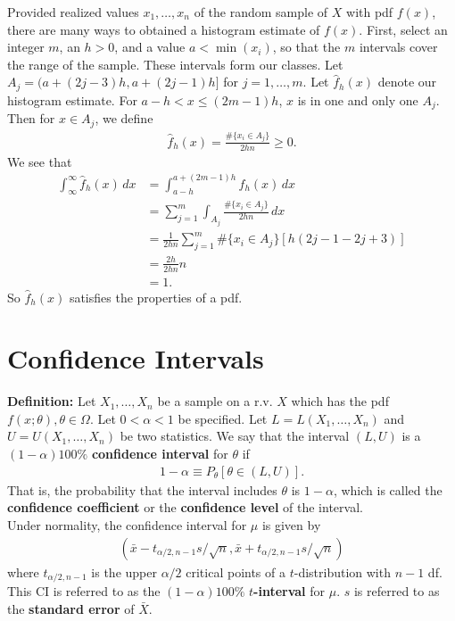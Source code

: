\documentclass{book}
\theoremstyle{definition}
\newcommand{\nn}{\nonumber}
\newcommand{\f}[2]{\frac{#1}{#2}}
\newcommand{\lp}{\left(}
\newcommand{\rp}{\right)}
\begin{document}
Provided realized values $x_1,\dots,x_n$ of the random sample of $X$ with pdf $f(x)$, there are many ways to obtained a histogram estimate of $f(x)$. First, select an integer $m$, an $h > 0$, and a value $a < \min(x_i)$, so that the $m$ intervals cover the range of the sample. These intervals form our classes.  Let $A_j =  ( a+ (2j-3)h, a+ (2j-1)h ] $ for $j = 1,\dots,m$. Let $\hat{f}_h(x)$ denote our histogram estimate. For $a-h < x \leq (2m-1)h$, $x$ is in one and only one $A_j$. Then for $x \in A_j$, we define
\begin{align}
\hat{f}_h(x) = \f{\# \{ x_i \in A_j \}}{2hn} \geq 0.
\end{align}
We see that 
\begin{align}
\int^\infty_{\infty}\hat{f}_h(x)\,dx &= \int^{a+(2m-1)h}_{a-h}\hat{f}_h(x)\,dx \nn\\
&= \sum^m_{j=1}\int_{A_j}\f{\#\{ x_i \in A_j \}}{2hn}\,dx \nn\\
&= \f{1}{2hn}\sum^m_{j=1}\#\{  x_i \in A_j \}[h(2j-1-2j+3)]\nn\\
&= \f{2h}{2hn}n\nn\\
&= 1.
\end{align}
So $\hat{f}_h(x)$ satisfies the properties of a pdf. 








\section{Confidence Intervals}
\noindent \textbf{Definition:} Let $X_1, \dots, X_n$ be a sample on a r.v. $X$ which has the pdf $f(x;\theta), \theta \in \Omega$. Let $0 < \alpha < 1$ be specified. Let $L = L(X_1,\dots,X_n)$ and $U =U(X_1,\dots,X_n)$ be two statistics. We say that the interval $(L,U)$ is a $(1-\alpha)100\%$ \textbf{confidence interval} for $\theta$ if
\begin{align}
1- \alpha \equiv P_\theta[\theta\in (L,U)].
\end{align}  
That is, the probability that the interval includes $\theta$ is $1-\alpha$, which is called the \textbf{confidence coefficient} or the \textbf{confidence level} of the interval.\\

Under normality, the confidence interval for $\mu$ is given by
\begin{align}
\boxed{\lp \bar{x} - t_{\alpha/2,n-1} s/\sqrt{n}, \bar{x}+ t_{\alpha/2, n-1}s/\sqrt{n} \rp}
\end{align}
where $t_{\alpha/2,n-1}$ is the upper $\alpha/2$ critical points of a $t$-distribution with $n-1$ df. This CI is referred to as the $(1-\alpha)100\%$ \textbf{$t$-interval} for $\mu$. $s$ is referred to as the \textbf{standard error} of $\bar{X}$. 
\end{document}
